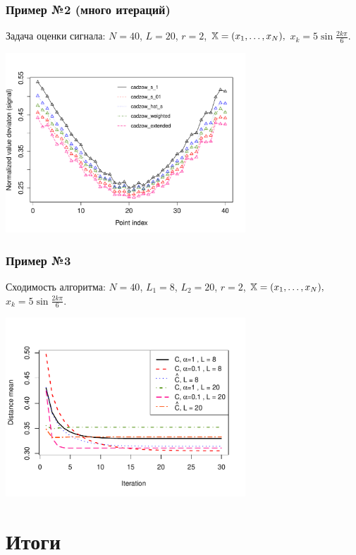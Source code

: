 \documentclass[unicode, notheorems]{beamer}
\begin{document}
\begin{frame}
  \frametitle{Пример №2 (много итераций)}
  Задача оценки сигнала: $N = 40$, $L = 20$, $r = 2$, $\mathbb{X} = (x_{1}, \ldots, x_N),$  $x_k = 5\sin{\frac{2 k \pi}{6}}$.

\begin{center}
	\includegraphics*[width = 9cm]{s1_it100.pdf}
\end{center}

\end{frame}

\begin{frame}
  \frametitle{Пример №3}
  Сходимость алгоритма: $N = 40$, $L_1 = 8$, $L_2 = 20$, $r = 2$, $\mathbb{X} = (x_{1}, \ldots, x_N),$  $x_k = 5\sin{\frac{2 k \pi}{6}}$.

\begin{center}
	\includegraphics*[width = 9cm]{cadzowspeed_2.pdf}
\end{center}

\end{frame}
\section{Итоги}
\end{document}
